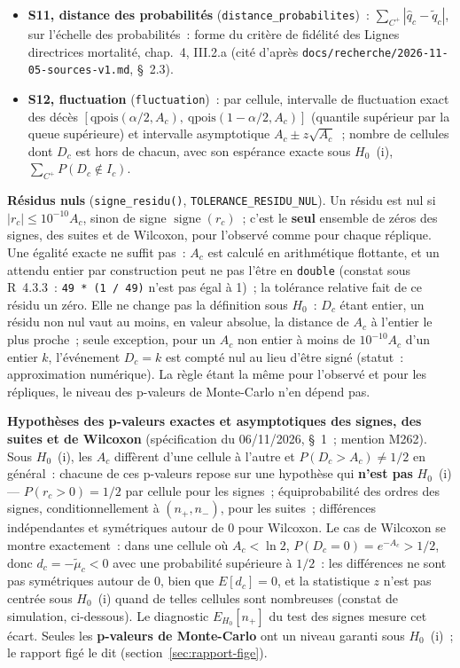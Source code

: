 \documentclass[a4paper,11pt]{article}
\newcommand{\code}[1]{\texttt{\small #1}}
\begin{document}
{\begin{itemize}[leftmargin=*, itemsep=2pt]
    est nul. Descriptif, fragile.
  \item \textbf{S11, distance des probabilités}
    (\code{distance\_probabilites})~: $\sum_{C^{+}} |\hat q_c - \tilde
    q_c|$, sur l'échelle des probabilités~: forme du critère de fidélité
    des Lignes directrices mortalité, chap.~4, III.2.a (cité d'après
    \code{docs/recherche/}\allowbreak\code{2026-11-05-sources-v1.md},
    §~2.3).
  \item \textbf{S12, fluctuation} (\code{fluctuation})~: par cellule,
    intervalle de fluctuation exact des décès $[\mathrm{qpois}(\alpha/2,
    A_c),\ \mathrm{qpois}(1 - \alpha/2, A_c)]$ (quantile supérieur par la
    queue supérieure) et intervalle asymptotique $A_c \pm z\sqrt{A_c}$~;
    nombre de cellules dont $D_c$ est hors de chacun, avec son espérance
    exacte sous $H_0$~(i), $\sum_{C^{+}} P(D_c \notin I_c)$.
\end{itemize}\par}

\noindent
\textbf{Résidus nuls} (\code{signe\_residu()}, \code{TOLERANCE\_RESIDU\_NUL}).
Un résidu est nul si $|r_c| \le 10^{-10} A_c$, sinon de signe $\operatorname{signe}(r_c)$~;
c'est le \textbf{seul} ensemble de zéros des signes, des suites et de
Wilcoxon, pour l'observé comme pour chaque réplique. Une égalité exacte ne
suffit pas~: $A_c$ est calculé en arithmétique flottante, et un attendu
entier par construction peut ne pas l'être en \code{double} (constat sous
R~4.3.3~: \code{49 * (1 / 49)} n'est pas égal à 1)~;
la tolérance relative fait de ce résidu un zéro. Elle ne change pas la
définition sous $H_0$~: $D_c$ étant entier, un résidu non nul vaut au
moins, en valeur absolue, la distance de $A_c$ à l'entier le plus
proche~; seule exception, pour un $A_c$ non entier à moins de
$10^{-10}A_c$ d'un entier $k$, l'événement $D_c = k$ est compté nul au
lieu d'être signé (statut~: approximation numérique). La règle étant la
même pour l'observé et pour les répliques, le niveau des p-valeurs de
Monte-Carlo n'en dépend pas.

\medskip
\noindent
\textbf{Hypothèses des p-valeurs exactes et asymptotiques des signes, des
suites et de Wilcoxon} (spécification du 06/11/2026, §~1~; mention M262). Sous
$H_0$~(i), les $A_c$ diffèrent d'une cellule à l'autre et $P(D_c > A_c)
\ne 1/2$ en général~: chacune de ces p-valeurs repose sur une hypothèse qui
\textbf{n'est pas} $H_0$~(i) --- $P(r_c > 0) = 1/2$ par cellule pour les
signes~; équiprobabilité des ordres des signes, conditionnellement à
$(n_{+}, n_{-})$, pour les suites~; différences indépendantes et
symétriques autour de 0 pour Wilcoxon. Le cas de Wilcoxon se montre
exactement~: dans une cellule où $A_c < \ln 2$, $P(D_c = 0) = e^{-A_c} >
1/2$, donc $d_c = -\tilde\mu_c < 0$ avec une probabilité supérieure à
$1/2$~: les différences ne sont pas symétriques autour de 0, bien que
$E[d_c] = 0$, et la statistique $z$ n'est pas centrée sous $H_0$~(i) quand
de telles cellules sont nombreuses (constat de simulation, ci-dessous). Le
diagnostic $E_{H_0}[n_{+}]$ du test des signes mesure cet écart. Seules les
\textbf{p-valeurs de Monte-Carlo} ont un niveau garanti sous $H_0$~(i)~;
le rapport figé le dit (section~\ref{sec:rapport-fige}).
\end{document}
